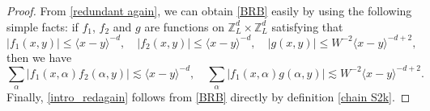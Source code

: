\documentclass{article}
\makeatletter
\newcommand{\1}{\mathds{1}}
\numberwithin{equation}{section}
\newcommand{\al}{\alpha}
\renewcommand{\cal}{\mathcal}
\renewcommand{\leq}{\leqslant}
\renewcommand{\le}{\leq}
\newcommand{\Z}{\mathbb{Z}}
\newcommand{\dashed}{\text{diffusive}}
\newcommand{\selfs}{\text{self-energies}}
\theoremstyle{plain} %
\theoremstyle{remark}
\newcommand{\cor}{\color{red}}
\newcommand{\Sdelta}{{\Sigma}_T}
\newcommand{\Sele}{{\mathcal E}}
\renewcommand{\subsection}{\@startsection
{subsection}%
{2}%
{0mm}%
{-\baselineskip}%
{0.5\baselineskip}%
{\normalfont\bf\itshape}} %
\newcommand{\hty}[1]{{\cor (ht: #1) }}
\makeatother
\begin{document}
\begin{proof}
From \eqref{redundant again}, we can obtain \eqref{BRB} easily by using the following simple facts: if $f_1$, $f_2$ and $g$ are functions on $\Z_L^d\times \Z_L^d$ satisfying that
$$|f_1(x,y)| \le \langle x-y\rangle^{-d}, \quad |f_2(x,y)| \le \langle x-y\rangle^{-d},\quad |g(x,y)| \le W^{-2}\langle x-y\rangle^{-d+2},$$
then we have
$$\sum_\al \left|f_1(x,\al)f_2(\al,y)\right|\lesssim \langle x-y\rangle^{-d},\quad \sum_\al \left|f_1(x,\al)g(\al,y)\right|\lesssim W^{-2} \langle x-y\rangle^{-d+2}. $$
Finally, \eqref{intro_redagain} follows from \eqref{BRB} directly by definition \eqref{chain S2k}.
\end{proof}



%
%
\end{document}
